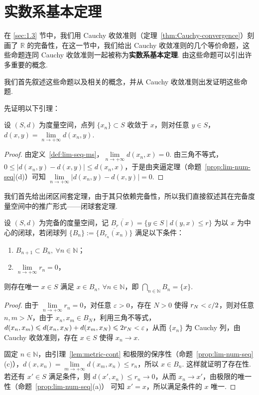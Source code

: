 \documentclass[../main.tex]{subfiles}
\begin{document}
\section{实数系基本定理} \label{sec:1.4}

在 \ref{sec:1.3} 节中，我们用 Cauchy 收敛准则（定理~\ref{thm:Cauchy-convergence}）刻画了 $\mathbb R$ 的完备性，在这一节中，我们给出 Cauchy 收敛准则的几个等价命题，这些命题连同 Cauchy 收敛准则一起被称为\textbf{实数系基本定理}. 由这些命题可以引出许多重要的概念. 

我们首先叙述这些命题以及相关的概念，并从 Cauchy 收敛准则出发证明这些命题. 

先证明以下引理：

\begin{lemma} \label{lem:metric-cont}
    设 $(S, d)$ 为度量空间，点列 $\{x_n\} \subset S$ 收敛于 $x$，则对任意 $y \in S$，$d(x, y) = \lim\limits_{n \to +\infty} d(x_n, y)$. 
\end{lemma}

\begin{proof}
    由定义~\ref{def:lim-seq-ms}，$\lim\limits_{n \to +\infty} d(x_n, x) = 0$. 由三角不等式，$0 \leqslant |d(x_n, y) - d(x, y)| \leqslant d(x_n, x)$，于是由夹逼定理（命题~\ref{prop:lim-num-seq}(d)）可知 $\lim\limits_{n \to +\infty} |d(x_n, y) - d(x, y)| = 0$. 
\end{proof}

我们首先给出闭区间套定理，由于其只依赖完备性，所以我们直接叙述其在完备度量空间中的推广形式——闭球套定理. 

\begin{theorem}[闭球套定理] \label{thm:nested-close-balls} 
    设 $(S, d)$ 为完备的度量空间，记 $\overline{B_r(x)} = \{y \in S \mid d(y, x) \leqslant r\}$ 为以 $x$ 为中心的闭球，若闭球列 $\{B_n\} := \{\overline{B_{r_n}(x_n)}\}$ 满足以下条件：
    \begin{enumerate}[label=(\alph*)]
        \item $B_{n + 1} \subset B_n,\ \forall n \in \mathbb N$；
        \item $\lim\limits_{n \to +\infty} r_n = 0$，
    \end{enumerate}
    则存在唯一 $x \in S$ 满足 $x \in B_n,\ \forall n \in \mathbb N$，即 $\bigcap\limits_{n \in \mathbb N} B_n = \{x\}$. 
\end{theorem}

\begin{proof}
    由于 $\lim\limits_{n \to +\infty} r_n = 0$，对任意 $\varepsilon > 0$，存在 $N > 0$ 使得 $r_N < \varepsilon / 2$，则对任意 $n, m > N$，由于 $x_n, x_m \in B_N$，利用三角不等式，$d(x_n, x_m) \leqslant d(x_n, x_N) + d(x_m, x_N) \leqslant 2r_N < \varepsilon$，从而 $\{x_n\}$ 为 Cauchy 列，由 Cauchy 收敛准则，存在 $x \in S$ 使得 $x_n \to x$. 

    固定 $n \in \mathbb N$，由引理~\ref{lem:metric-cont} 和极限的保序性（命题~\ref{prop:lim-num-seq}(c)），$d(x, x_n) = \lim\limits_{m \to +\infty} d(x_m, x_n) \leqslant r_n$，所以 $x \in B_n$. 这样就证明了存在性. 若还有 $x' \in S$ 满足条件，则 $d(x', x_n) \leqslant r_n \to 0$，从而 $x_n \to x'$，由极限的唯一性（命题~\ref{prop:lim-num-seq}(a)） 可知 $x' = x$，所以满足条件的 $x$ 唯一. 
\end{proof}
\end{document}
